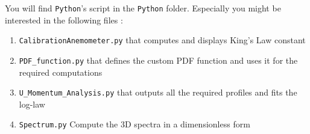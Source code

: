 \documentclass[12pt]{article}
\begin{document}
You will find \verb|Python|'s script in the \verb|Python| folder. Especially you might be interested in the following files :
\begin{enumerate}
    \item \verb|CalibrationAnemometer.py| that computes and displays King's Law constant
    \item \verb|PDF_function.py| that defines the custom PDF function and uses it for the required computations
    \item \verb|U_Momentum_Analysis.py| that outputs all the required profiles and fits the log-law
    \item \verb|Spectrum.py| Compute the 3D spectra in a dimensionless form
\end{enumerate}

\newpage


\end{document}
